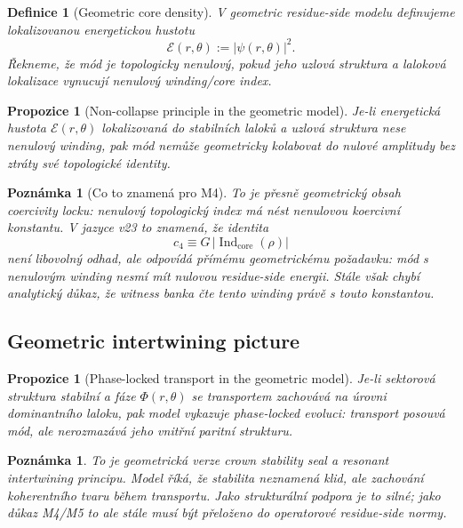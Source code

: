 \documentclass[11pt,a4paper]{article}
\newtheorem{definition}[theorem]{Definice}
\newtheorem{remark}[theorem]{Poznámka}
\newtheorem{proposition}[theorem]{Propozice}
\begin{document}
\begin{definition}[Geometric core density]
V geometric residue-side modelu definujeme lokalizovanou energetickou hustotu
\[
\mathcal E(r,\theta):=|\psi(r,\theta)|^2.
\]
Řekneme, že mód je \emph{topologicky nenulový}, pokud jeho uzlová struktura a laloková
lokalizace vynucují nenulový winding/core index.
\end{definition}

\begin{proposition}[Non-collapse principle in the geometric model]
Je-li energetická hustota \(\mathcal E(r,\theta)\) lokalizovaná do stabilních laloků
a uzlová struktura nese nenulový winding, pak mód nemůže geometricky kolabovat do nulové amplitudy
bez ztráty své topologické identity.
\end{proposition}

\begin{remark}[Co to znamená pro M4]
To je přesně geometrický obsah coercivity locku:
nenulový topologický index má nést nenulovou koercivní konstantu.
V jazyce v23 to znamená, že identita
\[
c_4 \equiv G\,|\operatorname{Ind}_{\mathrm{core}}(\rho)|
\]
není libovolný odhad, ale odpovídá přímému geometrickému požadavku:
mód s nenulovým winding nesmí mít nulovou residue-side energii.
Stále však chybí analytický důkaz, že witness banka čte tento winding právě s touto konstantou.
\end{remark}

\subsection*{Geometric intertwining picture}

\begin{proposition}[Phase-locked transport in the geometric model]
Je-li sektorová struktura stabilní a fáze \(\Phi(r,\theta)\) se transportem zachovává
na úrovni dominantního laloku, pak model vykazuje phase-locked evoluci:
transport posouvá mód, ale nerozmazává jeho vnitřní paritní strukturu.
\end{proposition}

\begin{remark}
To je geometrická verze crown stability seal a resonant intertwining principu.
Model říká, že stabilita neznamená klid, ale zachování koherentního tvaru během transportu.
Jako strukturální podpora je to silné; jako důkaz M4/M5 to ale stále musí být přeloženo
do operatorové residue-side normy.
\end{remark}
\end{document}
